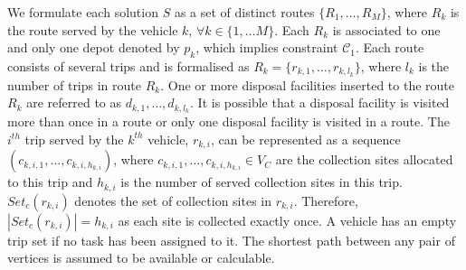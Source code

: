 \documentclass[journal]{IEEEtran}
\begin{document}
We formulate each solution $S$ as a set of distinct routes $\{R_1,\dots,R_{M}\}$, where $R_{k}$ is the route served by the vehicle $k$, $\forall k \in \{1, \dots M\}$.
Each $R_k$ is associated to one and only one depot denoted by $p_k$, which implies constraint $\mathcal{C}_1$.
Each route consists of several trips and is formalised as $R_{k}=\{r_{k,1},\dots, r_{k, l_k}\}$, where $l_k$ is the number of trips in route $R_{k}$. One or more disposal facilities inserted to the route $R_{k}$ are referred to as $d_{k,1}, \dots, d_{k,l_k}$. It is possible that a disposal facility is visited more than once in a route or only one disposal facility is visited in a route.
The $i^{th}$ trip served by the $k^{th}$ vehicle, $r_{k, i}$, can be represented as a sequence $(c_{k,i,1},\dots, c_{k,i,h_{k,i}})$, where $c_{k,i,1},\dots, c_{k,i,h_{k,i}} \in V_C$ are the collection sites allocated to this trip and $h_{k,i}$ is the number of served collection sites in this trip. $Set_c(r_{k, i})$ denotes the set of collection sites in $r_{k, i}$. Therefore, $|Set_c(r_{k, i})|=h_{k,i}$ as each site is collected exactly once.
A vehicle has an empty trip set if no task has been assigned to it.
The shortest path between any pair of vertices is assumed to be available or calculable.
\def\removed{
Therefore, we define directly variables $x_{i,j,v}$ ($v \in M$ and $i,j\in V$) to indicate if the vehicle $v$ travels from the vertex $i$ to the vertex $j$. Thus, $x_{i,j,v}=1$ if yes, otherwise $x_{i,j,v}=0$.
The objective of M3CVRP is minimising the total travel distance of all allocated vehicles, formalised as follows.
}
\end{document}
